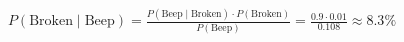 \documentclass[preview]{standalone}
\begin{document}
\begin{align*}
P(\text{Broken} \mid \text{Beep}) = \frac{P(\text{Beep} \mid \text{Broken}) \cdot P(\text{Broken})}{P(\text{Beep})} = \frac{0.9 \cdot 0.01}{0.108} \approx 8.3\%
\end{align*}
\end{document}
